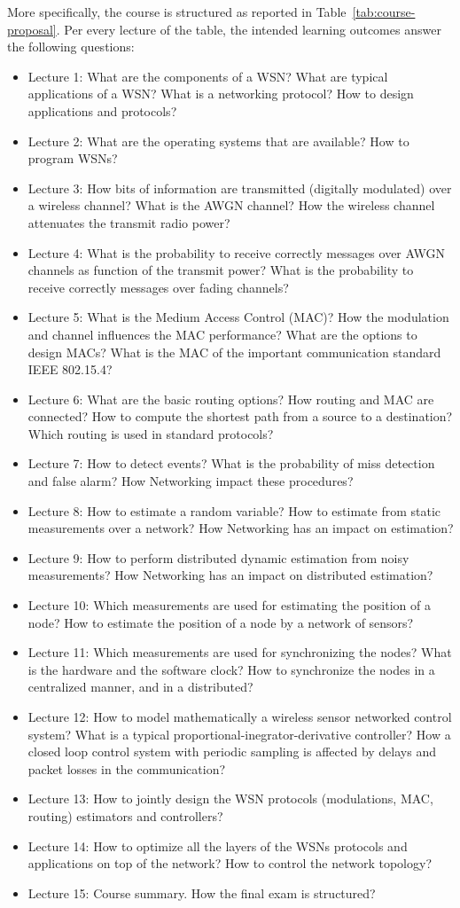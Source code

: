 \documentclass[onecolumn,12pt,draftclsnofoot,a4paper,peerreview]{IEEEtran}
\begin{document}
More specifically, the course is structured as reported in Table~\ref{tab:course-proposal}.  Per every lecture of the table, the intended learning outcomes answer the following questions: 
\begin{itemize}
\item Lecture 1: What are the components of a WSN? What are typical applications of a WSN? What is a networking protocol? How to design applications and protocols?
\item Lecture 2: What are the operating systems that are available? How to program WSNs? 
\item Lecture 3: How bits of information are transmitted (digitally modulated) over a wireless channel? What is the AWGN channel? How the wireless channel attenuates the transmit radio power? 
\item Lecture 4: What is the probability to receive correctly messages over AWGN
channels as function of the transmit power? What is the probability to receive correctly messages over fading
channels?
\item Lecture 5: What is the Medium Access Control (MAC)? How the modulation and channel influences the MAC performance? What are the options to design MACs?
What is the MAC of the important communication standard IEEE 802.15.4?
\item Lecture 6: What are the basic routing options? How routing and MAC are connected? How to compute the shortest path from a source to a destination? Which routing is used in standard protocols?
\item Lecture 7: How to detect events? What is the probability of miss detection and false alarm? How Networking impact these procedures? 
\item Lecture 8: How to estimate a random variable? How to estimate from static measurements over a network? How Networking has an impact on estimation? 
\item Lecture 9: How to perform distributed dynamic estimation from noisy measurements? How Networking has an impact on distributed estimation? 
\item Lecture 10: Which measurements are used for estimating the position of a node? How to estimate the position of a node by a network of sensors?
\item Lecture 11: Which measurements are used for synchronizing the nodes? What is the hardware and the software clock? How to synchronize the nodes in a centralized manner, and in a distributed?
\item Lecture 12: How to model mathematically a wireless sensor networked control system? What is a typical proportional-inegrator-derivative controller? How a closed loop control system with periodic sampling is affected by delays and packet losses in the communication?
\item Lecture 13: How to jointly design the WSN protocols (modulations, MAC, routing) estimators and controllers?
\item Lecture 14: How to optimize all the layers of the WSNs protocols and applications on top of the network? How to control the network topology?
\item Lecture 15: Course summary. How the final exam is structured? 
\end{itemize}
\end{document}
